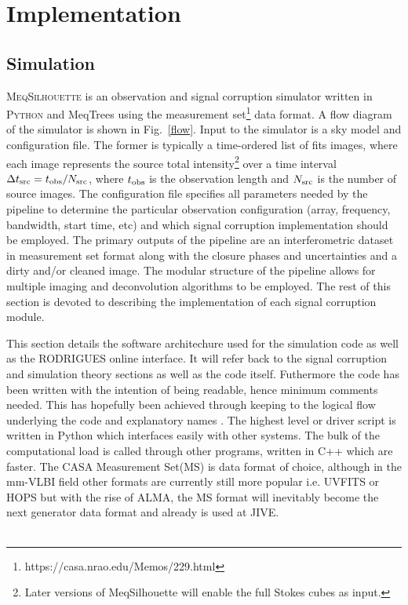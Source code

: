 \chapter{Implementation}

\section{Simulation}\label{sec:sim}
\textsc{MeqSilhouette} is an observation and signal corruption simulator written in \textsc{Python} and {\sc MeqTrees} using the  {\sc measurement set}\footnote{https://casa.nrao.edu/Memos/229.html}  data format. A flow diagram of the simulator is shown in Fig.~\ref{flow}. Input to the simulator is a sky model and configuration file. The former is typically a time-ordered list of {\sc fits} images, where each image represents the source total intensity\footnote{Later versions of {\sc MeqSilhouette} will enable the full Stokes cubes as input.} over a time interval $\Delta t_{\rm src} = t_{\rm obs}/N_{\rm src}$, where $t_{\rm obs}$ is the observation length and $N_{\rm src}$ is the number of source images. The configuration file specifies all parameters needed by the pipeline to determine the particular observation configuration (array, frequency, bandwidth, start time, etc) and which signal corruption implementation should be employed. The primary outputs of the pipeline are an interferometric dataset in {\sc measurement set} format along with the closure phases and uncertainties and a dirty and/or cleaned image. The modular structure of the pipeline allows for multiple imaging and deconvolution algorithms to be employed.  The rest of this section is devoted to describing the implementation of each signal corruption module.

This section details the software architechure used for the simulation code as well as the RODRIGUES online interface. It will refer back to the signal corruption and simulation theory sections as well as the code itself. Futhermore the code has been written with the intention of being readable, hence minimum comments needed. This has hopefully been achieved through keeping to the logical flow underlying the code and explanatory names .  The highest level or driver script is written in Python which interfaces easily with other systems.  The bulk of the computational load is called through other programs, written in C++ which are faster. The CASA Measurement Set(MS) is data format of choice, although in the mm-VLBI field other formats are currently still more popular i.e. UVFITS or HOPS but with the rise of ALMA, the MS format will inevitably become the next generator data format and already is used at JIVE. \\
~\\


